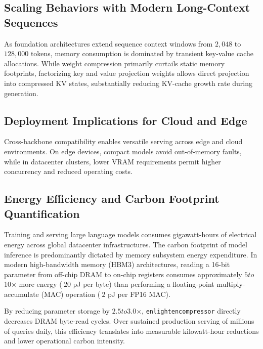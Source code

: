 \subsection{Scaling Behaviors with Modern Long-Context Sequences}
As foundation architectures extend sequence context windows from $2{,}048$ to $128{,}000$ tokens, memory consumption is dominated by transient key-value cache allocations. While weight compression primarily curtails static memory footprints, factorizing key and value projection weights allows direct projection into compressed KV states, substantially reducing KV-cache growth rate during generation.

\subsection{Deployment Implications for Cloud and Edge}
Cross-backbone compatibility enables versatile serving across edge and cloud environments. On edge devices, compact models avoid out-of-memory faults, while in datacenter clusters, lower VRAM requirements permit higher concurrency and reduced operating costs.

\subsection{Energy Efficiency and Carbon Footprint Quantification}
Training and serving large language models consumes gigawatt-hours of electrical energy across global datacenter infrastructures. The carbon footprint of model inference is predominantly dictated by memory subsystem energy expenditure. In modern high-bandwidth memory (HBM3) architectures, reading a 16-bit parameter from off-chip DRAM to on-chip registers consumes approximately $5$\times$ to $10$\times$ more energy ($~20$ pJ per byte) than performing a floating-point multiply-accumulate (MAC) operation ($~2$ pJ per FP16 MAC).

By reducing parameter storage by $2.5$\times$ to $3.0$\times$, \texttt{enlightencompressor} directly decreases DRAM byte-read cycles. Over sustained production serving of millions of queries daily, this efficiency translates into measurable kilowatt-hour reductions and lower operational carbon intensity.
